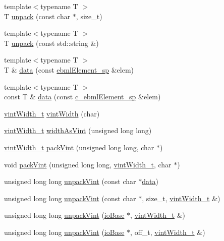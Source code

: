\begin{DoxyCompactItemize}
\item 
{\footnotesize template$<$typename T $>$ }\\T \mbox{\hyperlink{namespaceebml_a55a0f9d0c93e80d488021fd03c4f3861}{unpack}} (const char $\ast$, size\+\_\+t)
\item 
{\footnotesize template$<$typename T $>$ }\\T \mbox{\hyperlink{namespaceebml_a33d2b669314c64b95ed6c37534b6b655}{unpack}} (const std\+::string \&)
\item 
{\footnotesize template$<$typename T $>$ }\\T \& \mbox{\hyperlink{namespaceebml_a4edfd02f8910c0abfd4bbbf928f92d9e}{data}} (const \mbox{\hyperlink{namespaceebml_adad533b7705a16bb360fe56380c5e7be}{ebml\+Element\+\_\+sp}} \&elem)
\item 
{\footnotesize template$<$typename T $>$ }\\const T \& \mbox{\hyperlink{namespaceebml_ac78bf9d3ced3b11fedcb6172849b2cfc}{data}} (const \mbox{\hyperlink{namespaceebml_a2deef4e8071531b32e3533f1bf978917}{c\+\_\+ebml\+Element\+\_\+sp}} \&elem)
\item 
\mbox{\hyperlink{namespaceebml_a2ccdfb60b23efb51fe07f9d066e23604}{vint\+Width\+\_\+t}} \mbox{\hyperlink{namespaceebml_a025ed44f4346fdb6573b2bf336797f27}{vint\+Width}} (char)
\item 
\mbox{\hyperlink{namespaceebml_a2ccdfb60b23efb51fe07f9d066e23604}{vint\+Width\+\_\+t}} \mbox{\hyperlink{namespaceebml_a39e20a7de94c1f11f941e6cf63af370c}{width\+As\+Vint}} (unsigned long long)
\item 
\mbox{\hyperlink{namespaceebml_a2ccdfb60b23efb51fe07f9d066e23604}{vint\+Width\+\_\+t}} \mbox{\hyperlink{namespaceebml_a0ccc1293a99e95cd38a5125cb7d15361}{pack\+Vint}} (unsigned long long, char $\ast$)
\item 
void \mbox{\hyperlink{namespaceebml_ab96b36c3bf5bae473a35bec372103006}{pack\+Vint}} (unsigned long long, \mbox{\hyperlink{namespaceebml_a2ccdfb60b23efb51fe07f9d066e23604}{vint\+Width\+\_\+t}}, char $\ast$)
\item 
unsigned long long \mbox{\hyperlink{namespaceebml_a7928e2829b2feaf2516b0b019b28bf65}{unpack\+Vint}} (const char $\ast$\mbox{\hyperlink{namespaceebml_a6365629b3110a3c5d0cde94d08aac26c}{data}})
\item 
unsigned long long \mbox{\hyperlink{namespaceebml_a28d35d96aa75eadb27676a59d6972506}{unpack\+Vint}} (const char $\ast$, size\+\_\+t, \mbox{\hyperlink{namespaceebml_a2ccdfb60b23efb51fe07f9d066e23604}{vint\+Width\+\_\+t}} \&)
\item 
unsigned long long \mbox{\hyperlink{namespaceebml_aa37686e968c0b4654851623ecd21bf0a}{unpack\+Vint}} (\mbox{\hyperlink{classebml_1_1ioBase}{io\+Base}} $\ast$, \mbox{\hyperlink{namespaceebml_a2ccdfb60b23efb51fe07f9d066e23604}{vint\+Width\+\_\+t}} \&)
\item 
unsigned long long \mbox{\hyperlink{namespaceebml_a897f00b5febf5789f251984ec046b8bf}{unpack\+Vint}} (\mbox{\hyperlink{classebml_1_1ioBase}{io\+Base}} $\ast$, off\+\_\+t, \mbox{\hyperlink{namespaceebml_a2ccdfb60b23efb51fe07f9d066e23604}{vint\+Width\+\_\+t}} \&)
\end{DoxyCompactItemize}
